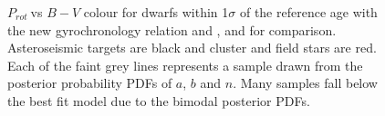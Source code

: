 \documentclass[useAMS, usenatbib]{mn2e}
\newcommand{\prot}{$P_{rot}~$}
\begin{document}
\begin{figure}
\begin{center}
{        }
    \end{center}
    \caption{ \prot vs $B-V$ colour for dwarfs within 1$\sigma$ of the
reference age with the new gyrochronology relation and \citet{Barnes2007}, and
\citet{Mamajek2008} for comparison.
Asteroseismic targets are black and
cluster and field stars are red.
Each of the faint grey lines represents a
sample drawn from the posterior probability PDFs of $a$, $b$ and $n$.
Many samples fall below the best fit model due to the bimodal posterior PDFs.
\label{fig:subfigures2}}
\end{figure}
\end{document}
